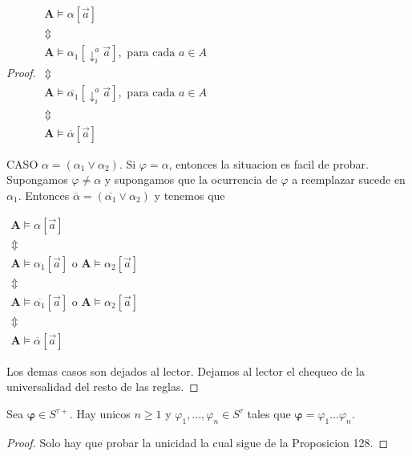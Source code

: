 \begin{proof}
    \(\displaystyle \begin{array}{c} \mathbf{A}\models \alpha \left[ \vec{a}\right] \\ \Updownarrow \\ \mathbf{A}\models \alpha _{1}\left[ \downarrow _{i}^{a}\vec{a}\right] ,\text{ para cada }a\in A \\ \Updownarrow \\ \mathbf{A}\models \overline{\alpha _{1}}\left[ \downarrow _{i}^{a}\vec{a} \right] ,\text{ para cada }a\in A \\ \Updownarrow \\ \mathbf{A}\models \overline{\alpha }\left[ \vec{a}\right] \end{array} \)

    CASO \(\alpha =(\alpha _{1}\vee \alpha _{2})\).
    Si \(\varphi =\alpha \), entonces la situacion es facil de probar. Supongamos \(\varphi \neq \alpha \) y supongamos que la ocurrencia de \(\varphi \) a reemplazar sucede en \(\alpha _{1}\). Entonces \(\overline{\alpha }=( \overline{\alpha _{1}}\vee \alpha _{2})\) y tenemos que

    \(\displaystyle \begin{array}{c} \mathbf{A}\models \alpha \left[ \vec{a}\right] \\ \Updownarrow \\ \mathbf{A}\models \alpha _{1}\left[ \vec{a}\right] \text{ o }\mathbf{A} \models \alpha _{2}\left[ \vec{a}\right] \\ \Updownarrow \\ \mathbf{A}\models \overline{\alpha _{1}}\left[ \vec{a}\right] \text{ o } \mathbf{A}\models \alpha _{2}\left[ \vec{a}\right] \\ \Updownarrow \\ \mathbf{A}\models \overline{\alpha }\left[ \vec{a}\right] \end{array} \)

    Los demas casos son dejados al lector.
    Dejamos al lector el chequeo de la universalidad del resto de las reglas.
  \end{proof}

  \begin{lemma}
    Sea \(\mathbf{\varphi }\in S^{\tau +}\). Hay unicos \(n\geq 1\) y \(\varphi _{1},...,\varphi _{n}\in S^{\tau }\) tales que \( \mathbf{\varphi }=\varphi _{1}...\varphi _{n}\).
  \end{lemma}
  \begin{proof}
    Solo hay que probar la unicidad la cual sigue de la Proposicion 128.
  \end{proof}

